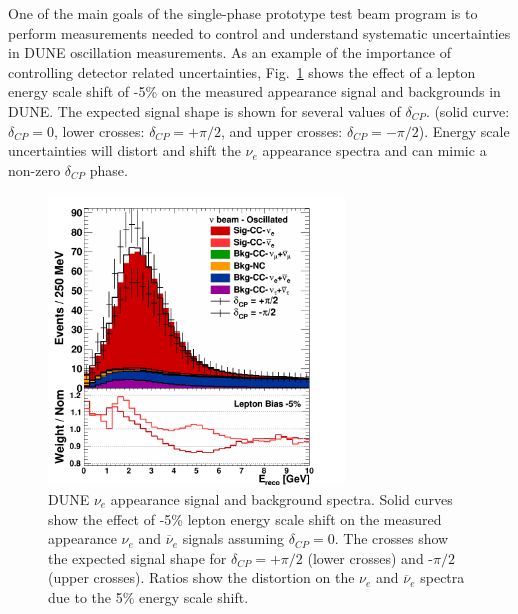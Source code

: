 One of the main goals of the single-phase prototype test beam program is to perform measurements 
needed to control and understand systematic uncertainties in DUNE oscillation measurements.
As an example of the importance of controlling detector related uncertainties,
Fig.~\ref{fig:spectraleffect} shows the effect of a lepton energy scale 
shift of -5\% on the measured 
appearance signal %
 and backgrounds in DUNE. 
The expected signal shape is shown for several values of $\delta_{CP}$. 
(solid curve: $\delta_{CP}=0$, lower crosses: $\delta_{CP}=+\pi/2$, and upper crosses: $\delta_{CP}=-\pi/2$). 
Energy scale uncertainties will distort and shift the $\nu_e$ appearance spectra and
can mimic a non-zero
$\delta_{CP}$ phase.
\begin{figure}[h!]
\centering
\includegraphics[width=0.7\textwidth,height=7.7cm]{figures/CSPP_LeptonBias_nue_app_FHC}

  \caption{\label{fig:spectraleffect} DUNE $\nu_e$ appearance signal and background spectra. 
Solid curves show the effect of -5\% lepton energy scale shift on the 
measured appearance $\nu_e$ and $\overline{\nu}_e$ signals assuming $\delta_{CP}=0$.
The crosses show the expected signal shape for $\delta_{CP}=+\pi/2$ (lower crosses) and -$\pi/2$  (upper crosses). 
Ratios show the distortion on the $\nu_e$ and $\overline{\nu}_e$ spectra due to the 
5\% energy scale shift.
}
\end{figure}


